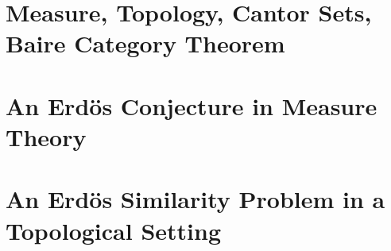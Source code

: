 \documentclass[12pt,oneside]{sfsuthesis}
\begin{document}
\thesistitle


\chapter{Measure, Topology, Cantor Sets, Baire Category Theorem}


\chapter{An Erd\"{o}s Conjecture in Measure Theory}


\chapter{An Erd\"{o}s Similarity Problem in a Topological Setting}





\printbibliography
\end{document}
